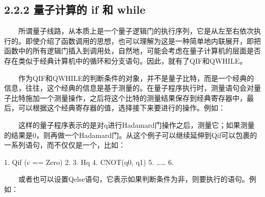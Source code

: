 \documentclass[a4paper,11pt,english]{sphinxmanual}
\begin{document}
\subsection{2.2.2 量子计算的 if 和 while}
\label{\detokenize{rst/2.2_u91cf_u5b50_u7a0b_u5e8f:if-while}}
\sphinxAtStartPar
  所谓量子线路，从本质上是一个量子逻辑门的执行序列，它是从左至右依次执行的。即使介绍了函数调用的思想，也可以理解为这是一种简单地内联展开，即把函数中的所有逻辑门插入到调用处，自然地，可能会考虑在量子计算机的层面是否存在类似于经典计算机中的循环和分支语句。因此，就有了QIF和QWHILE。

\sphinxAtStartPar
{}

\sphinxAtStartPar
  作为QIF和QWHILE的判断条件的对象，并不是量子比特，而是一个经典的信息，往往，这个经典的信息是基于测量的。在量子程序执行时，测量语句会对量子比特施加一个测量操作，之后将这个比特的测量结果保存到经典寄存器中，最后，可以根据这个经典寄存器的值，选择接下来要进行的操作。例如：

\begin{sphinxVerbatim}[commandchars=\\\{\}]
    
     
      
\end{sphinxVerbatim}

\sphinxAtStartPar
  这样的量子程序表示的是对q进行Hadamard门操作之后，测量它；如果测量的结果是0，则再做一个Hadamard门。从这个例子可以继续延伸到Qif可以包裹的一系列语句，而不仅仅是一个，比如：

\begin{sphinxVerbatim}[commandchars=\\\{\}]
1.  Qif (c == Zero)
2.  \PYGZob{}
3.          H\PYGZhy{}\PYGZgt{}q
4.          CNOT(q0, q1)
5.          ……
6.  \PYGZcb{}
\end{sphinxVerbatim}

\sphinxAtStartPar
  或者也可以设置Qelse语句，它表示如果判断条件为非，则要执行的语句。例如：

\begin{sphinxVerbatim}[commandchars=\\\{\}]
       
   
\end{sphinxVerbatim}
\end{document}
